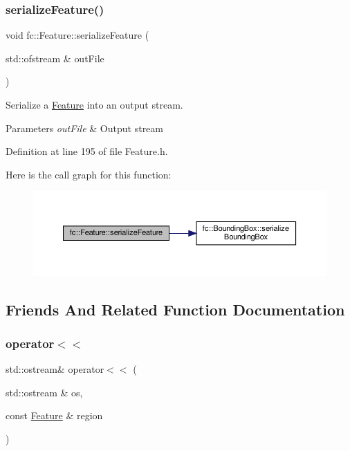 \subsubsection{\texorpdfstring{serialize\+Feature()}{serializeFeature()}}
{\footnotesize\ttfamily void fc\+::\+Feature\+::serialize\+Feature (\begin{DoxyParamCaption}\item[{std\+::ofstream \&}]{out\+File }\end{DoxyParamCaption})\hspace{0.3cm}{\ttfamily [inline]}}



Serialize a \hyperlink{classfc_1_1Feature}{Feature} into an output stream. 


\begin{DoxyParams}{Parameters}
{\em out\+File} & Output stream \\
\hline
\end{DoxyParams}


Definition at line 195 of file Feature.\+h.

Here is the call graph for this function\+:
\nopagebreak
\begin{figure}[H]
\begin{center}
\leavevmode
\includegraphics[width=350pt]{d7/d71/classfc_1_1Feature_ac37080e8b096f9d2024e761f18495578_cgraph}
\end{center}
\end{figure}


\subsection{Friends And Related Function Documentation}
\mbox{\label{classfc_1_1Feature_a87a7af61219690a546906a8d61762dce}} 
\subsubsection{\texorpdfstring{operator$<$$<$}{operator<<}}
{\footnotesize\ttfamily std\+::ostream\& operator$<$$<$ (\begin{DoxyParamCaption}\item[{std\+::ostream \&}]{os,  }\item[{const \hyperlink{classfc_1_1Feature}{Feature} \&}]{region }\end{DoxyParamCaption})\hspace{0.3cm}{\ttfamily [friend]}}



